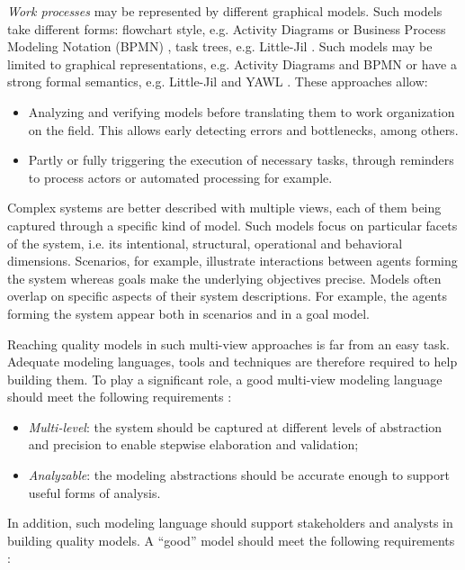 
\emph{Work processes} may be represented by different graphical models. Such models take different forms: flowchart style, e.g. Activity Diagrams \cite{OMG:2004} or Business Process Modeling Notation (BPMN) \cite{OMG:2008}, task trees, e.g. Little-Jil \cite{Clarke:2008}. Such models may be limited to graphical representations, e.g. Activity Diagrams and BPMN or have a strong formal semantics, e.g. Little-Jil and YAWL \cite{Vanderaalst:2005}. These approaches allow:

\begin{itemize}
\item Analyzing and verifying models before translating them to work organization on the field. This allows early detecting errors and bottlenecks, among others.
\item Partly or fully triggering the execution of necessary tasks, through reminders to process actors or automated processing for example.
\end{itemize}


Complex systems are better described with multiple views, each of them being captured through a specific kind of model. Such models focus on particular facets of the system, i.e. its intentional, structural, operational and behavioral dimensions. Scenarios, for example, illustrate interactions between agents forming the system whereas goals make the underlying objectives precise. Models often overlap on specific aspects of their system descriptions. For example, the agents forming the system appear both in scenarios and in a goal model.

Reaching quality models in such multi-view approaches is far from an easy task. Adequate modeling languages, tools and techniques are therefore required to help building them. To play a significant role, a good multi-view modeling language should meet the following requirements \cite{VanLamsweerde:2009}:

\begin{itemize}
\item \emph{Multi-level}: the system should be captured at different levels of abstraction and precision to enable stepwise elaboration and validation;
\item \emph{Analyzable}: the modeling abstractions should be accurate enough to support useful forms of analysis.
\end{itemize}

In addition, such modeling language should support stakeholders and analysts in building quality models. A ``good'' model should meet the following requirements \cite{VanLamsweerde:2009}:

